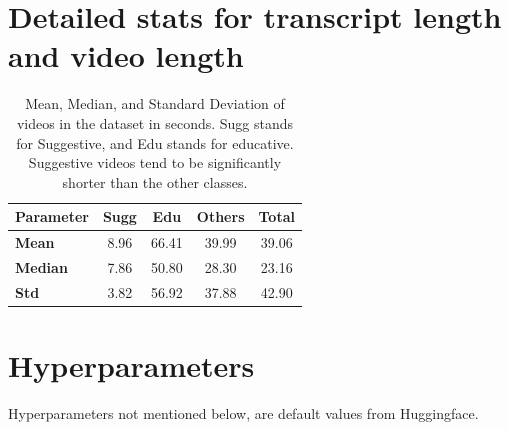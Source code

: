 \documentclass[11pt]{article}
\begin{document}
\section{Detailed stats for transcript length and video length}

\begin{table}[H]
\centering
{}
\caption{Mean, Median, and Standard Deviation of words present in video transcripts. Words were tokenized using the NLTK package.  Sugg stands for Suggestive, and Edu stands for educative. Suggestive videos tend to be significantly shorter than the other classes.}

\end{table}

\begin{table}[H]
\centering
\begin{tabular}{lcccc}
\hline
\textbf{Parameter} &  \textbf{Sugg} & \textbf{Edu} & \textbf{Others} & \textbf{Total}  \\
\hline
\textbf{Mean} & 8.96 &  66.41 &  39.99 & 39.06  \\
\textbf{Median} & 7.86 &  50.80 & 	28.30 & 23.16   \\
\textbf{Std} & 3.82 & 56.92 & 37.88 &	42.90 \\
\hline
\end{tabular}
\caption{Mean, Median, and Standard Deviation of videos in the dataset in seconds. Sugg stands for Suggestive, and Edu stands for educative. Suggestive videos tend to be significantly shorter than the other classes.}

\end{table}

\section{Hyperparameters}

Hyperparameters not mentioned below, are default values from Huggingface.
\label{appendix:c}
\end{document}
